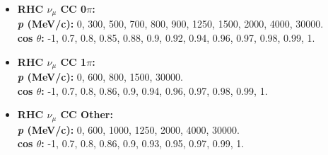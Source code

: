 \begin{itemize}
\item \textbf{RHC $\nu_{\mu}$ CC 0$\pi$:}\\
\textbf{\textit{p} (MeV/c):} 0, 300, 500, 700, 800, 900, 1250, 1500, 2000, 4000, 30000.\\
\textbf{cos $\theta$:} -1, 0.7, 0.8, 0.85, 0.88, 0.9, 0.92, 0.94, 0.96, 0.97, 0.98, 0.99, 1.

\item \textbf{RHC $\nu_{\mu}$ CC 1$\pi$:}\\
\textbf{\textit{p} (MeV/c):} 0, 600, 800, 1500, 30000.\\
\textbf{cos $\theta$:} -1, 0.7, 0.8, 0.86, 0.9, 0.94, 0.96, 0.97, 0.98, 0.99, 1.

\item \textbf{RHC $\nu_{\mu}$ CC Other:}\\
\textbf{\textit{p} (MeV/c):} 0, 600, 1000, 1250, 2000, 4000, 30000.\\
\textbf{cos $\theta$:} -1, 0.7, 0.8, 0.86, 0.9, 0.93, 0.95, 0.97, 0.99, 1.

\end{itemize}

